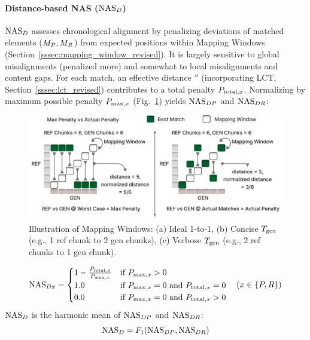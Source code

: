 \paragraph{Distance-based NAS ($\text{NAS}_D$)} %
\label{sssec:nasd_revised} %
$\text{NAS}_D$ assesses chronological alignment by penalizing deviations of matched elements ($M_P, M_R$) from expected positions within Mapping Windows (Section~\ref{sssec:mapping_window_revised}). It is largely sensitive to global misalignments (penalized more) and somewhat to local misalignments and content gaps. For each match, an effective distance $\dprime$ (incorporating LCT, Section~\ref{sssec:lct_revised}) contributes to a total penalty $P_{\text{total},x}$. Normalizing by maximum possible penalty $P_{\text{max},x}$ (Fig.~\ref{fig:max_penalty}) yields $\text{NAS}_{DP}$ and $\text{NAS}_{DR}$:
\begin{figure}[ht] %
  \centering
  \includegraphics[width=1\textwidth]{MaxP.pdf} %
  \caption{Illustration of Mapping Windows: (a) Ideal 1-to-1, (b) Concise $T_{\text{gen}}$ (e.g., 1 ref chunk to 2 gen chunks), (c) Verbose $T_{\text{gen}}$ (e.g., 2 ref chunks to 1 gen chunk).}
  \label{fig:max_penalty} %
\end{figure}
\begin{equation} \label{eq:nas_dx_revised}
\text{NAS}_{Dx} =
\begin{cases}
1 - \frac{P_{\text{total},x}}{P_{\text{max},x}} & \text{if } P_{\text{max},x} > 0 \\
1.0 & \text{if } P_{\text{max},x} = 0 \text{ and } P_{\text{total},x} = 0 \\
0.0 & \text{if } P_{\text{max},x} = 0 \text{ and } P_{\text{total},x} > 0
\end{cases}
\quad (x \in \{P, R\})
\end{equation}
$\text{NAS}_D$ is the harmonic mean of $\text{NAS}_{DP}$ and $\text{NAS}_{DR}$:
\begin{equation} \label{eq:nas_d_revised}
\text{NAS}_D = F_1(\text{NAS}_{DP}, \text{NAS}_{DR})
\end{equation}

